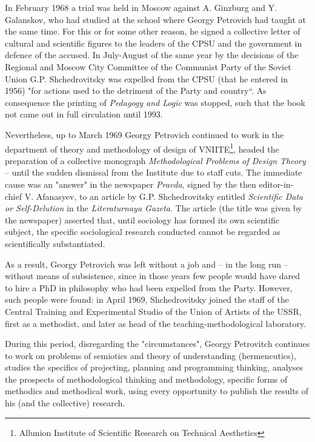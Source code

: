 \documentclass[a4paper,11pt]{article}
\begin{document}
In February 1968 a trial was held in Moscow against A. Ginzburg and
Y. Galanskov, who had studied at the school where Georgy Petrovich had taught
at the same time. For this or for some other reason, he signed a collective
letter of cultural and scientific figures to the leaders of the CPSU and the
government in defence of the accused. In July-August of the same year by the
decisions of the Regional and Moscow City Committee of the Communist Party of
the Soviet Union G.P. Shchedrovitsky was expelled from the CPSU (that he
entered in 1956) "for actions used to the detriment of the Party and country“.
As consequence the printing of \emph{Pedagogy and Logic} was stopped, such
that the book not came out in full circulation until 1993.

Nevertheless, up to March 1969 Georgy Petrovich continued to work in the
department of theory and methodology of design of VNIITE\footnote{Allunion
  Institute of Scientific Research on Technical Aesthetics}, headed the
preparation of a collective monograph \emph{Methodological Problems of Design
  Theory} -- until the sudden dismissal from the Institute due to staff cuts.
The immediate cause was an "answer" in the newspaper \emph{Pravda}, signed by
the then editor-in-chief V. Afanasyev, to an article by G.P. Shchedrovitsky
entitled \emph{Scientific Data or Self-Delution} in the \emph{Literaturnaya
  Gazeta}.  The article (the title was given by the newspaper) asserted that,
until sociology has formed its own scientific subject, the specific
sociological research conducted cannot be regarded as scientifically
substantiated.

As a result, Georgy Petrovich was left without a job and -- in the long run --
without means of subsistence, since in those years few people would have dared
to hire a PhD in philosophy who had been expelled from the Party. However,
such people were found: in April 1969, Shchedrovitsky joined the staff of the
Central Training and Experimental Studio of the Union of Artists of the USSR,
first as a methodist, and later as head of the teaching-methodological
laboratory.

During this period, disregarding the "circumstances", Georgy Petrovitch
continues to work on problems of semiotics and theory of understanding
(hermeneutics), studies the specifics of projecting, planning and programming
thinking, analyses the prospects of methodological thinking and methodology,
specific forms of methodics and methodical work, using every opportunity to
publish the results of his (and the collective) research.
\end{document}

